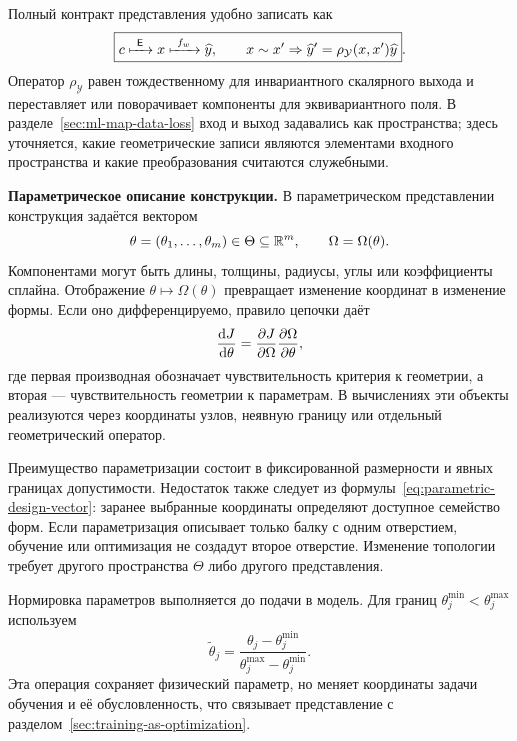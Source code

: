 Полный контракт представления удобно записать как
\begin{equation}
 \boxed{
 c
 \xmapsto{\ \mathsf E\ }
 x
 \xmapsto{\ f_w\ }
 \widehat y,
 \qquad
 x\sim x'
 \Rightarrow
 \widehat y' = \rho_{\mathcal Y}(x,x')\widehat y
 }.
\end{equation}
Оператор $\rho_{\mathcal Y}$ равен тождественному для инвариантного скалярного выхода и переставляет или поворачивает компоненты для эквивариантного поля. В разделе~\ref{sec:ml-map-data-loss} вход и выход задавались как пространства; здесь уточняется, какие геометрические записи являются элементами входного пространства и какие преобразования считаются служебными.

\medskip
\noindent\textbf{Параметрическое описание конструкции.}
В параметрическом представлении конструкция задаётся вектором
\begin{equation}
\label{eq:parametric-design-vector}
 \theta=(\theta_1,\ldots,\theta_m)\in\Theta\subseteq\mathbb{R}^m,
 \qquad
 \Omega=\Omega(\theta).
\end{equation}
Компонентами могут быть длины, толщины, радиусы, углы или коэффициенты сплайна. Отображение $\theta\mapsto\Omega(\theta)$ превращает изменение координат в изменение формы. Если оно дифференцируемо, правило цепочки даёт
\begin{equation}
 \frac{\mathop{}\!\mathrm{d} J}{\mathop{}\!\mathrm{d} \theta}
 =
 \frac{\partial J}{\partial \Omega}
 \frac{\partial \Omega}{\partial \theta},
\end{equation}
где первая производная обозначает чувствительность критерия к геометрии, а вторая --- чувствительность геометрии к параметрам. В вычислениях эти объекты реализуются через координаты узлов, неявную границу или отдельный геометрический оператор.

Преимущество параметризации состоит в фиксированной размерности и явных границах допустимости. Недостаток также следует из формулы~\eqref{eq:parametric-design-vector}: заранее выбранные координаты определяют доступное семейство форм. Если параметризация описывает только балку с одним отверстием, обучение или оптимизация не создадут второе отверстие. Изменение топологии требует другого пространства $\Theta$ либо другого представления.

Нормировка параметров выполняется до подачи в модель. Для границ $\theta_j^{\min}<\theta_j^{\max}$ используем
\begin{equation}
 \widetilde\theta_j
 =
 \frac{\theta_j-\theta_j^{\min}}
      {\theta_j^{\max}-\theta_j^{\min}}.
\end{equation}
Эта операция сохраняет физический параметр, но меняет координаты задачи обучения и её обусловленность, что связывает представление с разделом~\ref{sec:training-as-optimization}.

